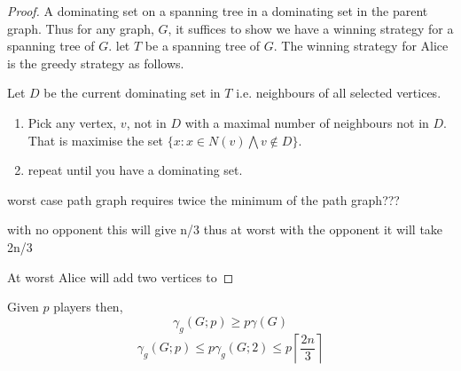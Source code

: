 \begin{proof}
    A dominating set on a spanning tree in a dominating set in the parent graph.
    Thus for any graph, $G$, it suffices to show we have a winning strategy for a spanning tree of $G$. 
    let $T$ be a spanning tree of $G$.
    The winning strategy for Alice is the greedy strategy as follows. 
    
    Let $D$ be the current dominating set in $T$ i.e. neighbours of all selected vertices.
    \begin{enumerate}
        \item Pick any vertex, $v$, not in $D$ with a maximal number of neighbours not in $D$. That is maximise the set $\{x: x \in N(v) \bigwedge v \notin D\}$.
        \item repeat until you have a dominating set.
    \end{enumerate}

       worst case path graph requires twice the minimum of the path graph???
       
       with no opponent this will give n/3 thus at worst with the opponent it will take 2n/3 
       
    At worst Alice will add two vertices to 
\end{proof}

\begin{theorem} %
    Given $p$ players then,
    \[\gamma_{g}(G;p) \geq p\gamma(G) \]    
    \[\gamma_{g}(G;p) \leq p \gamma_{g}(G;2) \leq p\left\lceil \frac{2n}{3} \right\rceil\]
\end{theorem}













